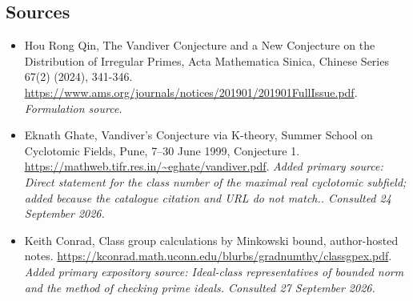 \documentclass[11pt]{article}
\begin{document}
\subsection{Sources}
\begin{itemize}
\item[S1]Hou Rong Qin, The Vandiver Conjecture and a New Conjecture on the Distribution of Irregular Primes, Acta Mathematica Sinica, Chinese Series 67(2) (2024), 341-346.
\url{https://www.ams.org/journals/notices/201901/201901FullIssue.pdf}.
\textit{Formulation source.}
\item[E1]Eknath Ghate, Vandiver’s Conjecture via K-theory, Summer School on Cyclotomic Fields, Pune, 7–30 June 1999, Conjecture 1.
\url{https://mathweb.tifr.res.in/~eghate/vandiver.pdf}.
\textit{Added primary source: Direct statement for the class number of the maximal real cyclotomic subfield; added because the catalogue citation and URL do not match.. Consulted 24 September 2026.}
\item[E2]Keith Conrad, Class group calculations by Minkowski bound, author-hosted notes.
\url{https://kconrad.math.uconn.edu/blurbs/gradnumthy/classgpex.pdf}.
\textit{Added primary expository source: Ideal-class representatives of bounded norm and the method of checking prime ideals. Consulted 27 September 2026.}
\end{itemize}
\end{document}
